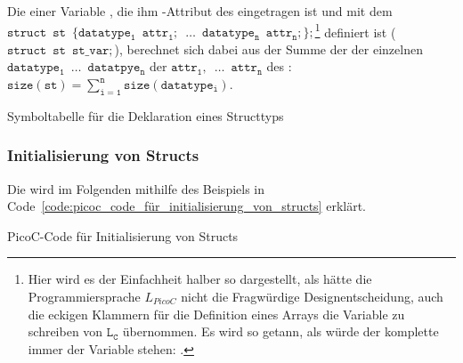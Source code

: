 \begin{Special_Paragraph}
  Die  einer Variable , die ihm -Attribut des  eingetragen ist und mit dem  $\mathtt{struct\enspace st\enspace \{datatype_1\enspace attr_1;\enspace\ldots\enspace datatype_n\enspace attr_n;\};}$\footnote{Hier wird es der Einfachheit halber so dargestellt, als hätte die Programmiersprache $L_{PicoC}$ nicht die Fragwürdige Designentscheidung, auch die eckigen Klammern \smalltt{[]} für die Definition eines Arrays  die Variable zu schreiben von $\mathtt{L_C}$ übernommen. Es wird so getann, als würde der komplette  immer  der Variable stehen: .} definiert ist ($\mathtt{struct\enspace st\enspace st\_var;}$), berechnet sich dabei aus der Summe der  der einzelnen  $\mathtt{datatype_1\enspace \ldots\enspace datatpye_n}$ der  $\mathtt{attr_1,\enspace \ldots\enspace attr_n}$ des : $\mathtt{size(st) = \sum^n_{i=1} size(datatype_i)}$.
\end{Special_Paragraph}

\begin{code}
  \centering
  \caption{Symboltabelle für die Deklaration eines Structtyps}
  \label{code:symboltabelle_für_die_deklaration_eines_structtyps}
\end{code}

\subsubsection{Initialisierung von Structs}

Die  wird im Folgenden mithilfe des Beispiels in Code~\ref{code:picoc_code_für_initialisierung_von_structs} erklärt.

\begin{code}
  \centering
  \caption{PicoC-Code für Initialisierung von Structs}
  \label{code:picoc_code_für_initialisierung_von_structs}
\end{code}

